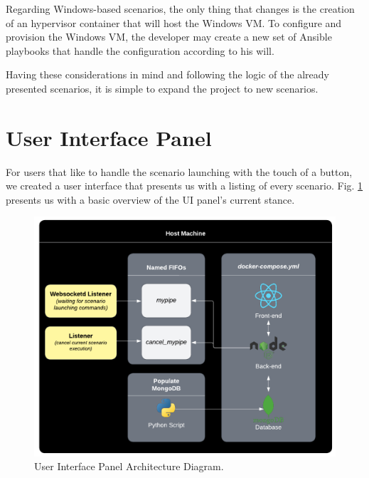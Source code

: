 Regarding Windows-based scenarios, the only thing that changes is the creation of an hypervisor container that will host the Windows VM. To configure and provision the Windows VM, the developer may create a new set of Ansible playbooks that handle the configuration according to his will.

Having these considerations in mind and following the logic of the already presented scenarios, it is simple to expand the project to new scenarios. 


\section{User Interface Panel} \label{sec:validation_ui}

For users that like to handle the scenario launching with the touch of a button, we created a user interface that presents us with a listing of every scenario. Fig. \ref{fig:ui_architecture_diagram} presents us with a basic overview of the UI panel's current stance.

\begin{figure}[H]
    \includegraphics[width=14cm]{figures/ui_diagram.pdf}
    \caption{User Interface Panel Architecture Diagram.}
    \label{fig:ui_architecture_diagram}
\end{figure}

